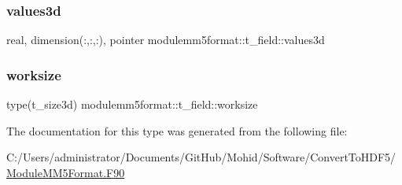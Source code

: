 \mbox{\label{structmodulemm5format_1_1t__field_a217b9a32d3ab47816680434f225b5870}} 
\subsubsection{\texorpdfstring{values3d}{values3d}}
{\footnotesize\ttfamily real, dimension(\+:,\+:,\+:), pointer modulemm5format\+::t\+\_\+field\+::values3d\hspace{0.3cm}{\ttfamily [private]}}

\mbox{\label{structmodulemm5format_1_1t__field_aa7dc209aec17c604adceb0510fda5540}} 
\subsubsection{\texorpdfstring{worksize}{worksize}}
{\footnotesize\ttfamily type(t\+\_\+size3d) modulemm5format\+::t\+\_\+field\+::worksize\hspace{0.3cm}{\ttfamily [private]}}



The documentation for this type was generated from the following file\+:\begin{DoxyCompactItemize}
\item 
C\+:/\+Users/administrator/\+Documents/\+Git\+Hub/\+Mohid/\+Software/\+Convert\+To\+H\+D\+F5/\mbox{\hyperlink{_module_m_m5_format_8_f90}{Module\+M\+M5\+Format.\+F90}}\end{DoxyCompactItemize}
